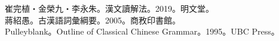 崔完植‧金榮九‧李永朱。漢文讀解法。2019。明文堂。\\
蔣紹愚。古漢語詞彙綱要。2005。商敄印書館。\\
Pulleyblank。Outline of Classical Chinese Grammar。1995。UBC Press。\\

